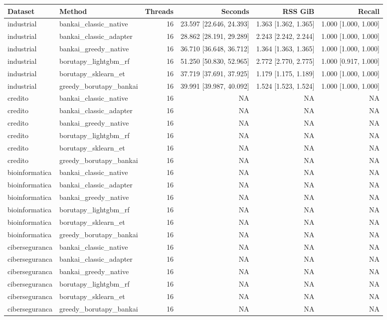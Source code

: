\begin{tabular}{llrrrr}
Dataset & Method & Threads & Seconds & RSS GiB & Recall \\
\hline
industrial & bankai\_classic\_native & 16 & 23.597 [22.646, 24.393] & 1.363 [1.362, 1.365] & 1.000 [1.000, 1.000] \\
industrial & bankai\_classic\_adapter & 16 & 28.862 [28.191, 29.289] & 2.243 [2.242, 2.244] & 1.000 [1.000, 1.000] \\
industrial & bankai\_greedy\_native & 16 & 36.710 [36.648, 36.712] & 1.364 [1.363, 1.365] & 1.000 [1.000, 1.000] \\
industrial & borutapy\_lightgbm\_rf & 16 & 51.250 [50.830, 52.965] & 2.772 [2.770, 2.775] & 1.000 [0.917, 1.000] \\
industrial & borutapy\_sklearn\_et & 16 & 37.719 [37.691, 37.925] & 1.179 [1.175, 1.189] & 1.000 [1.000, 1.000] \\
industrial & greedy\_borutapy\_bankai & 16 & 39.991 [39.987, 40.092] & 1.524 [1.523, 1.524] & 1.000 [1.000, 1.000] \\
credito & bankai\_classic\_native & 16 & NA & NA & NA \\
credito & bankai\_classic\_adapter & 16 & NA & NA & NA \\
credito & bankai\_greedy\_native & 16 & NA & NA & NA \\
credito & borutapy\_lightgbm\_rf & 16 & NA & NA & NA \\
credito & borutapy\_sklearn\_et & 16 & NA & NA & NA \\
credito & greedy\_borutapy\_bankai & 16 & NA & NA & NA \\
bioinformatica & bankai\_classic\_native & 16 & NA & NA & NA \\
bioinformatica & bankai\_classic\_adapter & 16 & NA & NA & NA \\
bioinformatica & bankai\_greedy\_native & 16 & NA & NA & NA \\
bioinformatica & borutapy\_lightgbm\_rf & 16 & NA & NA & NA \\
bioinformatica & borutapy\_sklearn\_et & 16 & NA & NA & NA \\
bioinformatica & greedy\_borutapy\_bankai & 16 & NA & NA & NA \\
ciberseguranca & bankai\_classic\_native & 16 & NA & NA & NA \\
ciberseguranca & bankai\_classic\_adapter & 16 & NA & NA & NA \\
ciberseguranca & bankai\_greedy\_native & 16 & NA & NA & NA \\
ciberseguranca & borutapy\_lightgbm\_rf & 16 & NA & NA & NA \\
ciberseguranca & borutapy\_sklearn\_et & 16 & NA & NA & NA \\
ciberseguranca & greedy\_borutapy\_bankai & 16 & NA & NA & NA \\
\end{tabular}
